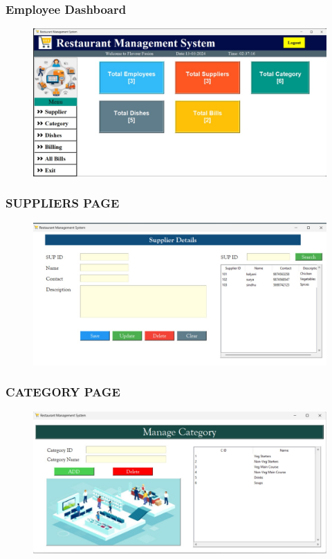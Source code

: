 \documentclass{beamer}
\begin{document}
\begin{frame}
  \frametitle{Employee Dashboard}
  \begin{figure}
    \centering
    \includegraphics[width=1.0\linewidth]{employeedashboard.jpg} 
  \end{figure}
\end{frame}

\begin{frame}
  \frametitle{SUPPLIERS PAGE}
  \begin{figure}
    \centering
    \includegraphics[width=1.0\linewidth]{supplierspage.jpg} 
  \end{figure}
\end{frame}

\begin{frame}
  \frametitle{CATEGORY PAGE}
  \begin{figure}
    \centering
    \includegraphics[width=1.0\linewidth]{categorypage.jpg} 
  \end{figure}
\end{frame}
\end{document}
